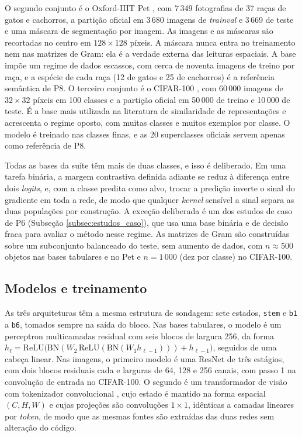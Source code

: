 O segundo conjunto é o Oxford-IIIT Pet \citep{Parkhi2012}, com 7\,349 fotografias de 37 raças de gatos e cachorros, a partição oficial em 3\,680 imagens de \textit{trainval} e 3\,669 de teste e uma máscara de segmentação por imagem. As imagens e as máscaras são recortadas no centro em $128\times128$ píxeis. A máscara nunca entra no treinamento nem nas matrizes de Gram: ela é a verdade externa das leituras espaciais. A base impõe um regime de dados escassos, com cerca de noventa imagens de treino por raça, e a espécie de cada raça (12 de gatos e 25 de cachorros) é a referência semântica de P8. O terceiro conjunto é o CIFAR-100 \citep{Krizhevsky2009}, com 60\,000 imagens de $32\times32$ píxeis em 100 classes e a partição oficial em 50\,000 de treino e 10\,000 de teste. É a base mais utilizada na literatura de similaridade de representações \citep{Kornblith2019} e acrescenta o regime oposto, com muitas classes e muitos exemplos por classe. O modelo é treinado nas classes finas, e as 20 superclasses oficiais servem apenas como referência de P8.

Todas as bases da suíte têm mais de duas classes, e isso é deliberado. Em uma tarefa binária, a margem contrastiva definida adiante se reduz à diferença entre dois \textit{logits}, e, com a classe predita como alvo, trocar a predição inverte o sinal do gradiente em toda a rede, de modo que qualquer \textit{kernel} sensível a sinal separa as duas populações por construção. A exceção deliberada é um dos estudos de caso de P6 (Subseção \ref{subsec:estudos_caso}), que usa uma base binária e de decisão fraca para avaliar o método nesse regime. As matrizes de Gram são construídas sobre um subconjunto balanceado do teste, sem aumento de dados, com $n \approx 500$ objetos nas bases tabulares e no Pet e $n = 1\,000$ (dez por classe) no CIFAR-100.

\subsection{Modelos e treinamento}\label{subsec:modelo}

As três arquiteturas têm a mesma estrutura de sondagem: sete estados, \texttt{stem} e \texttt{b1} a \texttt{b6}, tomados sempre na saída do bloco. Nas bases tabulares, o modelo é um perceptron multicamadas residual com seis blocos de largura 256, da forma $h_{\ell} = \mathrm{ReLU}\bigl(\mathrm{BN}(W_2\,\mathrm{ReLU}(\mathrm{BN}(W_1 h_{\ell-1}))) + h_{\ell-1}\bigr)$, seguidos de uma cabeça linear. Nas imagens, o primeiro modelo é uma ResNet \citep{He2016} de três estágios, com dois blocos residuais cada e larguras de 64, 128 e 256 canais, com passo 1 na convolução de entrada no CIFAR-100. O segundo é um transformador de visão com tokenizador convolucional \citep{Hassani2021}, cujo estado é mantido na forma espacial $(C, H, W)$ e cujas projeções são convoluções $1\times1$, idênticas a camadas lineares por \textit{token}, de modo que as mesmas fontes são extraídas das duas redes sem alteração do código.

